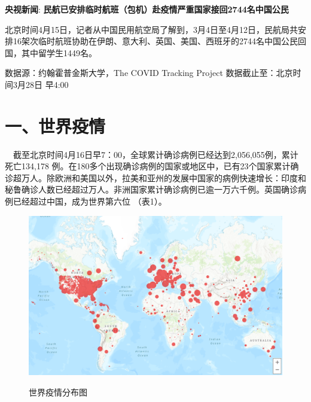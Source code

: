 \documentclass[]{article}
\begin{document}
\textbf{\textcolor{glaucous}{央视新闻}}:
\textbf{民航已安排临时航班（包机）赴疫情严重国家接回2744名中国公民}

北京时间4月15日，记者从中国民用航空局了解到，3月4日至4月12日，民航局共安排16架次临时航班协助在伊朗、意大利、英国、美国、西班牙的2744名中国公民回国，其中留学生1449名。

\newpage

%
  \noindent{}%

\begin{small}
{数据源：约翰霍普金斯大学，The COVID Tracking Project \quad   数据截止至：北京时间3月28日 早4:00}
\end{small}

\hypertarget{section-2}{%
\section{\texorpdfstring{\textcolor{glaucous}{一、世界疫情}}{}}\label{section-2}}

\(\quad\)截至北京时间4月16日早7：00，全球累计确诊病例已经达到2,056,055例，累计死亡134,178
例。在180多个出现确诊病例的国家或地区中，已有23个国家累计确诊超万人。除欧洲和美国以外，拉美和亚州的发展中国家的病例快速增长：印度和秘鲁确诊人数已经超过万人。非洲国家累计确诊病例已逾一万六千例。英国确诊病例已经超过中国，成为世界第六位
（表1）。

\begin{figure}[H]
\caption{世界疫情分布图} %
\centering
\includegraphics[]{./input/covid1.png} %
\label{} %
\end{figure}
\end{document}
